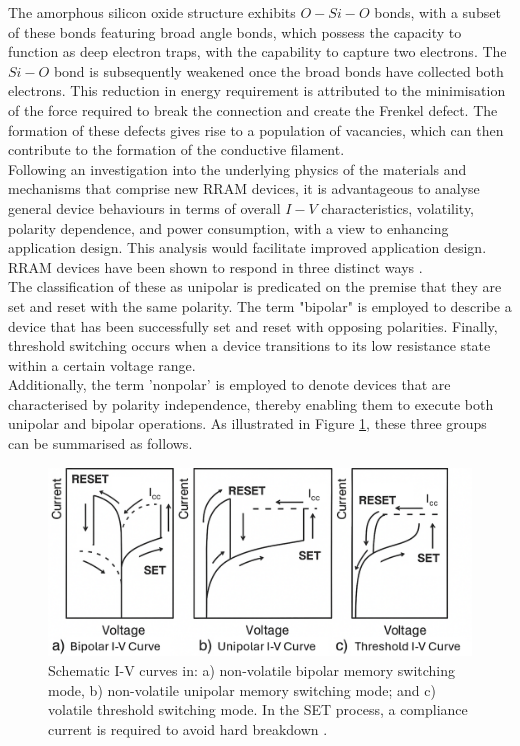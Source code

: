 \noindent The amorphous silicon oxide structure exhibits $O-Si-O$ bonds, with a subset of these bonds featuring broad angle bonds, which possess the capacity to function as deep electron traps, with the capability to capture two electrons. The $Si-O$ bond is subsequently weakened once the broad bonds have collected both electrons. This reduction in energy requirement is attributed to the minimisation of the force required to break the connection and create the Frenkel defect. The formation of these defects gives rise to a population of vacancies, which can then contribute to the formation of the conductive filament. \\

\noindent Following an investigation into the underlying physics of the materials and mechanisms that comprise new RRAM devices, it is advantageous to analyse general device behaviours in terms of overall $I-V$ characteristics, volatility, polarity dependence, and power consumption, with a view to enhancing application design. This analysis would facilitate improved application design. RRAM devices have been shown to respond in three distinct ways \cite{li2017resistive}. \\

\noindent The classification of these as unipolar is predicated on the premise that they are set and reset with the same polarity. The term "bipolar" is employed to describe a device that has been successfully set and reset with opposing polarities. Finally, threshold switching occurs when a device transitions to its low resistance state within a certain voltage range. \\

\noindent Additionally, the term 'nonpolar' is employed to denote devices that are characterised by polarity independence, thereby enabling them to execute both unipolar and bipolar operations. As illustrated in Figure \ref{fig:3w}, these three groups can be summarised as follows. \\

\begin{figure}[htbp!] 
    \centering    
    \includegraphics[width=1\textwidth]{Chapter3/Figs/w.png}
    \caption[Schematic I-V curves.]{Schematic I-V curves in: a) non-volatile bipolar memory switching mode, b) non-volatile unipolar memory switching mode; and c) volatile threshold switching mode. In the SET process, a compliance current is required to avoid hard breakdown \cite{li2017resistive}.}
    \label{fig:3w}
\end{figure}

